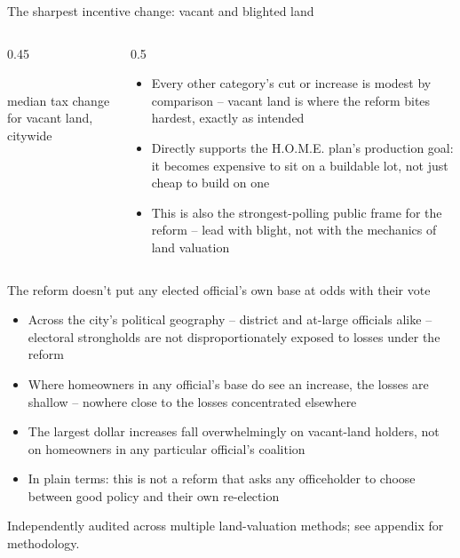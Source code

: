 \documentclass[aspectratio=169,11pt]{beamer}
\begin{document}
\begin{frame}{The sharpest incentive change: vacant and blighted land}
\begin{columns}[T]
\begin{column}{0.45\linewidth}
\vspace{1.2em}
\begin{center}
\deckbignum[deckhi]{\PhlVacantLandMedianRefined{}}\\[0.3em]
{\small\color{deckmuted} median tax change for vacant land, citywide}
\end{center}
\end{column}
\begin{column}{0.5\linewidth}
\vspace{1.0em}
\begin{itemize}
\item Every other category's cut or increase is modest by comparison -- vacant land is where the reform bites hardest, exactly as intended
\item Directly supports the H.O.M.E. plan's production goal: it becomes expensive to sit on a buildable lot, not just cheap to build on one
\item This is also the strongest-polling public frame for the reform -- lead with blight, not with the mechanics of land valuation
\end{itemize}
\end{column}
\end{columns}
\end{frame}

\begin{frame}{The reform doesn't put any elected official's own base at odds with their vote}
\begin{itemize}
\item Across the city's political geography -- district and at-large officials alike -- electoral strongholds are not disproportionately exposed to losses under the reform
\item Where homeowners in any official's base do see an increase, the losses are shallow -- nowhere close to the losses concentrated elsewhere
\item The largest dollar increases fall overwhelmingly on vacant-land holders, not on homeowners in any particular official's coalition
\item In plain terms: this is not a reform that asks any officeholder to choose between good policy and their own re-election
\end{itemize}
\vspace{1.0em}
{\footnotesize\color{deckmuted} Independently audited across multiple land-valuation methods; see appendix for methodology.}
\end{frame}
\end{document}
